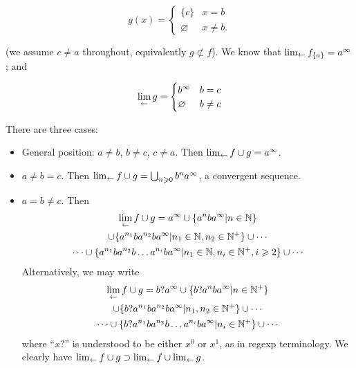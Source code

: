 \documentclass{article}
\theoremstyle{definition}
\let\emptyset\varnothing
\begin{document}
\begin{equation}
  g(x) = \begin{cases}
    \lbrace c\rbrace & x=b\\
    \emptyset & x\neq b.
    \end{cases}
\end{equation}

(we assume $c\neq a$ throughout, equivalently $g\not\subset f$).  We
know that $\lim_{\leftarrow} f_{\lbrace a\rbrace}=a^\infty$; and

\begin{equation}
  \invlim{g}=\begin{cases}
  b^\infty & b=c\\
  \emptyset &b\neq c
  \end{cases}
\end{equation}


There are three cases:

\begin{itemize}
\item General position: $a\neq b$, $b\neq c$, $c\neq a$.  Then
  $\lim_{\leftarrow} f\cup g=a^\infty$.
\item $a\neq b=c$.  Then $\lim_{\leftarrow} f\cup g=\bigcup_{n\geqslant
  0}b^na^\infty$, a convergent sequence.
\item $a=b\neq c$.  Then
  \begin{multline}
    \lim_{\leftarrow} f\cup g=
    a^\infty\cup
    \lbrace a^nba^\infty|n\in\mathbb{N}\rbrace\\
    \cup\lbrace a^{n_1}ba^{n_2}ba^\infty|n_1\in\mathbb{N},n_2\in\mathbb{N^+}\rbrace
    \cup\cdots\\
    \cdots\cup\lbrace a^{n_1}ba^{n_2}b\ldots a^{n_i}ba^\infty|n_1\in\mathbb{N},n_i\in\mathbb{N}^+,i\geqslant 2\rbrace
    \cup\cdots
  \end{multline}
  Alternatively, we may write
  \begin{multline}
    \lim_{\leftarrow} f\cup g=
    b?a^\infty\cup
    \lbrace b?a^nba^\infty|n\in\mathbb{N^+}\rbrace\\
    \cup\lbrace b?a^{n_1}ba^{n_2}ba^\infty|n_1,n_2\in\mathbb{N^+}\rbrace
    \cup\cdots\\
    \cdots\cup\lbrace b?a^{n_1}ba^{n_2}b\ldots a^{n_i}ba^\infty|n_i\in\mathbb{N}^+\rbrace\cup\cdots
  \end{multline}
  where ``$x?$'' is understood to be either $x^0$ or $x^1$, as in
  regexp terminology.  We clearly have $\lim_{\leftarrow} f\cup
    g\supset\lim_{\leftarrow} f\cup\lim_{\leftarrow} g$.
\end{itemize}
\end{document}
